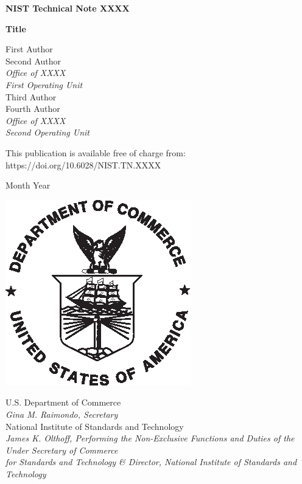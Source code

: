 \documentclass[
  12pt,
]{article}
\begin{document}
\begin{titlepage}
 
\begin{flushright}
 
\LARGE{\textbf{NIST Technical Note XXXX}}\\
\vfill 
 
\Huge{\textbf{Title}}\\
\vfill
 
\normalsize First Author\\
Second Author\\
\textit{Office of XXXX}\\
\textit{First Operating Unit}\\
\vspace{12pt}
Third Author\\
Fourth Author\\
\textit{Office of XXXX}\\
\textit{Second Operating Unit}\\
\vfill
 
\normalsize This publication is available free of charge from:\\
https://doi.org/10.6028/NIST.TN.XXXX\\
\vfill
 
\normalsize Month Year
\vfill
    

\includegraphics[width=0.18\linewidth]{DoC-logo.eps}\\ 
\vfill
 
\footnotesize U.S. Department of Commerce\\ 
\textit{Gina M. Raimondo, Secretary}\\
\vspace{10pt}
National Institute of Standards and Technology\\ 
\hspace*{-3cm}\textit{James K. Olthoff, Performing the Non-Exclusive Functions and Duties of the Under Secretary of Commerce \\
for Standards and Technology \& Director, National Institute of Standards and Technology} 
\end{flushright}
\end{titlepage}
\end{document}
